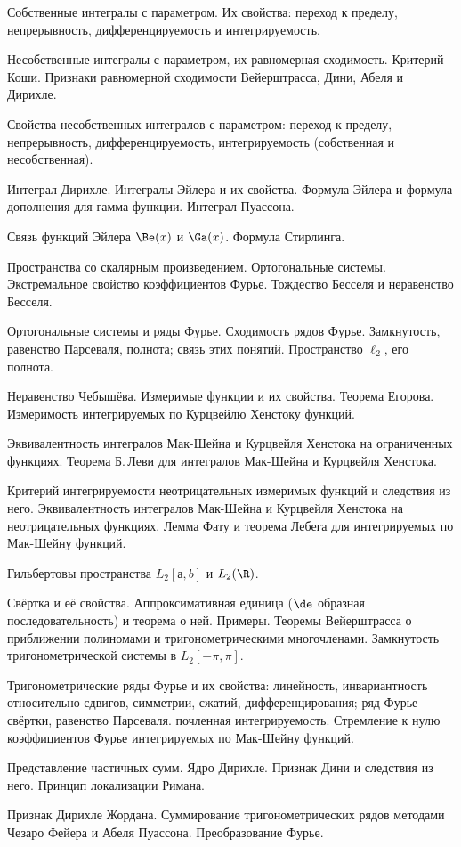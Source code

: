 \documentclass[a4paper]{article}
\begin{document}
\begin{nums}{-4}
\item Собственные интегралы с параметром. Их свойства: переход к пределу, непрерывность, дифференцируемость и интегрируемость.
\item Несобственные интегралы с параметром, их равномерная сходимость. Критерий Коши. Признаки равномерной сходимости Вейерштрасса,
Дини, Абеля и Дирихле.
\item Свойства несобственных интегралов с параметром: переход к пределу, непрерывность, дифференцируемость, интегрируемость
(собственная и несобственная).
\item Интеграл Дирихле. Интегралы Эйлера и их свойства. Формула Эйлера и формула дополнения для гамма функции. Интеграл Пуассона.
\item Связь функций Эйлера $\Be(x)$ и $\Ga(x)$. Формула Стирлинга.
\item Пространства со скалярным произведением. Ортогональные системы. Экстремальное свойство коэффициентов Фурье. Тождество
Бесселя и неравенство Бесселя.
\item Ортогональные системы и ряды Фурье. Сходимость рядов Фурье. Замкнутость, равенство Парсеваля, полнота; связь этих понятий.
Пространство $\ell_2$, его полнота.
\item Неравенство Чебышёва. Измеримые функции и их свойства. Теорема Егорова. Измеримость интегрируемых по Курцвейлю Хенстоку функций.
\item Эквивалентность интегралов Мак-Шейна и Курцвейля Хенстока на ограниченных функциях. Теорема Б.\,Леви для интегралов
Мак-Шейна и Курцвейля Хенстока.
\item Критерий интегрируемости неотрицательных измеримых функций и следствия из него. Эквивалентность интегралов Мак-Шейна и
Курцвейля Хенстока на неотрицательных функциях. Лемма Фату и теорема Лебега для интегрируемых по Мак-Шейну функций.
\item Гильбертовы пространства $L_2[а,b]$ и $L_2(\R)$.
\item Свёртка и её свойства. Аппроксимативная единица ($\de$ образная последовательность) и теорема о ней. Примеры. Теоремы
Вейерштрасса о приближении полиномами и тригонометрическими многочленами. Замкнутость тригонометрической системы в $L_2[-\pi,\pi]$.
\item Тригонометрические ряды Фурье и их свойства: линейность, инвариантность относительно сдвигов, симметрии, сжатий,
дифференцирования; ряд Фурье свёртки, равенство Парсеваля. почленная интегрируемость. Стремление к нулю коэффициентов Фурье
интегрируемых по Мак-Шейну функций.
\item Представление частичных сумм. Ядро Дирихле. Признак Дини и следствия из него. Принцип локализации Римана.
\item Признак Дирихле Жордана. Суммирование тригонометрических рядов методами Чезаро Фейера и Абеля Пуассона.
Преобразование Фурье.
\end{nums}
\end{document}
